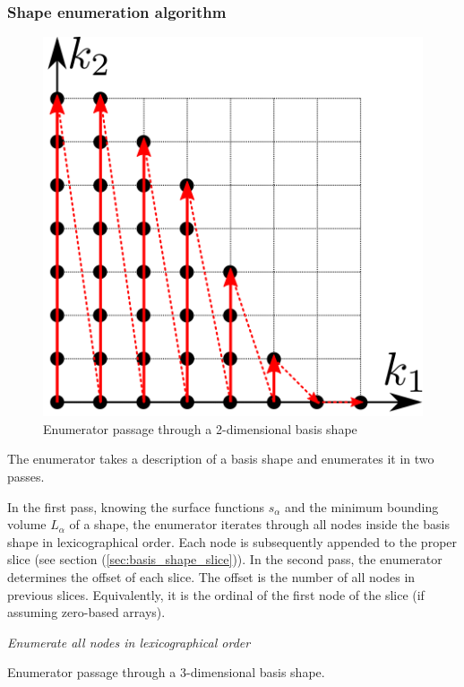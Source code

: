 \documentclass{article}
\begin{document}
\subsubsection{Shape enumeration algorithm}

\begin{figure}[H]
  \centering
  \includegraphics[]{shape_enumerator}
  \caption{Enumerator passage through a 2-dimensional basis shape}
  \label{fig:shape_example}
\end{figure}

The enumerator takes a description of a basis shape and enumerates it in two passes.

In the first pass, knowing the surface functions \(s_{\alpha}\)
and the minimum bounding volume \(L_{\alpha}\) of a shape,
the enumerator iterates through all nodes inside the basis shape in lexicographical order.
Each node is subsequently appended to the proper slice (see section (\ref{sec:basis_shape_slice})).
In the second pass, the enumerator determines the offset of each slice.
The offset is the number of all nodes in previous slices. Equivalently, it is the
ordinal of the first node of the slice (if assuming zero-based arrays).

\begin{algorithm}[H]
  \emph{Enumerate all nodes in lexicographical order}\;
  \caption{Enumerator passage through a 3-dimensional basis shape.}
  \label{fig:enumerator_pass_3d}
\end{algorithm}
\end{document}
